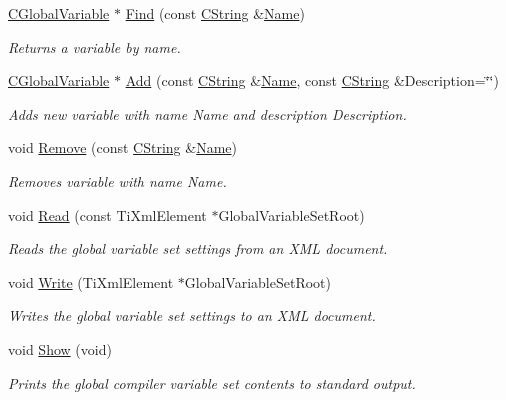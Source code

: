 \begin{DoxyCompactItemize}
\hyperlink{classCGlobalVariable}{C\-Global\-Variable} $\ast$ \hyperlink{classCGlobalVariableSet_ae9a1594a776f6180d2a60e7193a56fc6}{Find} (const \hyperlink{classCString}{C\-String} \&\hyperlink{classCGlobalVariableSet_a08cc77bcf9fecf6174d6bbd79802f80b}{Name})
\begin{DoxyCompactList}\small\item\em Returns a variable by name. \end{DoxyCompactList}\item 
\hyperlink{classCGlobalVariable}{C\-Global\-Variable} $\ast$ \hyperlink{classCGlobalVariableSet_a603f5fe8300989991baf8688c8fbf38e}{Add} (const \hyperlink{classCString}{C\-String} \&\hyperlink{classCGlobalVariableSet_a08cc77bcf9fecf6174d6bbd79802f80b}{Name}, const \hyperlink{classCString}{C\-String} \&Description=\char`\"{}\char`\"{})
\begin{DoxyCompactList}\small\item\em Adds new variable with name {\itshape Name} and description {\itshape Description}. \end{DoxyCompactList}\item 
void \hyperlink{classCGlobalVariableSet_a3bcfe5c42e32f6aa7fd9f1fbb032e1dd}{Remove} (const \hyperlink{classCString}{C\-String} \&\hyperlink{classCGlobalVariableSet_a08cc77bcf9fecf6174d6bbd79802f80b}{Name})
\begin{DoxyCompactList}\small\item\em Removes variable with name {\itshape Name}. \end{DoxyCompactList}\item 
void \hyperlink{classCGlobalVariableSet_aed6a2a2e0211b5c7ff2a8b27dfcfc3db}{Read} (const Ti\-Xml\-Element $\ast$Global\-Variable\-Set\-Root)
\begin{DoxyCompactList}\small\item\em Reads the global variable set settings from an X\-M\-L document. \end{DoxyCompactList}\item 
void \hyperlink{classCGlobalVariableSet_aa2ffbccce40889ce4ee3d9f47195d5b1}{Write} (Ti\-Xml\-Element $\ast$Global\-Variable\-Set\-Root)
\begin{DoxyCompactList}\small\item\em Writes the global variable set settings to an X\-M\-L document. \end{DoxyCompactList}\item 
void \hyperlink{classCGlobalVariableSet_aadcb96f0e337b4102a864af282d97ce8}{Show} (void)
\begin{DoxyCompactList}\small\item\em Prints the global compiler variable set contents to standard output. \end{DoxyCompactList}\item 

\end{DoxyCompactItemize}
